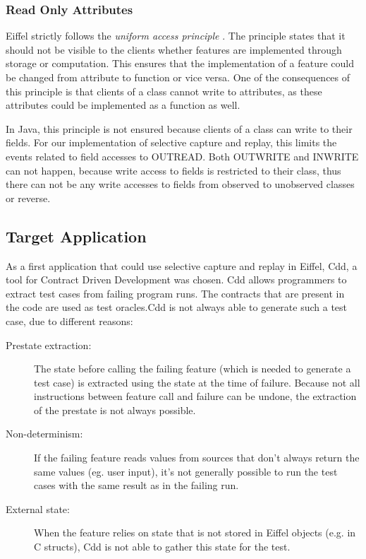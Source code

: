 \subsubsection{Read Only Attributes}
Eiffel strictly follows the \emph{uniform access principle} \cite{oosc2}. The principle states that it should not be visible to the clients whether features are implemented through storage or computation. This ensures that the implementation of a feature could be changed from attribute to function or vice versa. One of the consequences of this principle is that clients of a class cannot write to attributes, as these attributes could be implemented as a function as well.

In Java, this principle is not ensured because clients of a class can write to their fields. For our implementation of selective capture and replay, this limits the events related to field accesses to OUTREAD. Both OUTWRITE and INWRITE can not happen, because write access to fields is restricted to their class, thus there can not be any write accesses to fields from observed to unobserved classes or reverse.

\subsection{Target Application}
As a first application that could use selective capture and replay in Eiffel, Cdd, a tool for Contract Driven Development \cite{cdd07} was chosen. Cdd allows programmers to extract test cases from failing program runs. The contracts that are present in the code are used as test oracles.Cdd is not always able to generate such a test case, due to different reasons:

\begin{description}
\item [Prestate extraction:] The state before calling the failing feature (which is needed to generate a test case) is extracted using the state at the time of failure. Because not all instructions between feature call and failure can be undone, the extraction of the prestate is not always possible.
\item [Non-determinism:] If the failing feature reads values from sources that don't always return the same values (eg. user input), it's not generally possible to run the test cases with the same result as in the failing run.
\item [External state:] When the feature relies on state that is not stored in Eiffel objects (e.g. in C structs), Cdd is not able to gather this state for the test.
\end{description}

